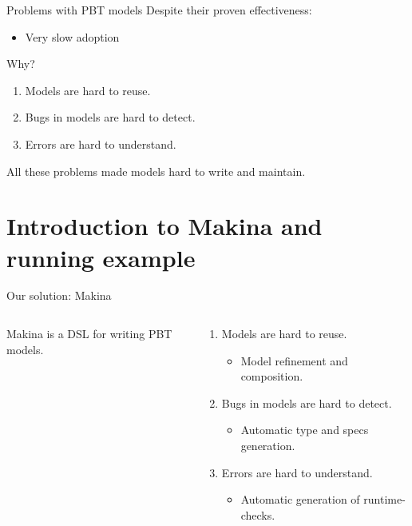 \documentclass[aspectratio=169, 10pt, handout]{beamer}
\begin{document}
\begin{frame}[label={sec:org48f1cea}]{Problems with PBT models}
Despite their proven effectiveness:
\begin{itemize}
\item Very slow adoption
\end{itemize}

\vspace{10pt}

Why?

\vspace{10pt}

\begin{enumerate}
\item Models are hard to reuse.
\item Bugs in models are hard to detect.
\item Errors are hard to understand.
\end{enumerate}

\vspace{10pt}

All these problems made models hard to write and maintain.
\end{frame}

\section{Introduction to Makina and running example}
\label{sec:org5b65cdf}
\begin{frame}[label={sec:org69a2064}]{Our solution: Makina}
\begin{columns}
\begin{column}{0.48\columnwidth}
Makina is a DSL for writing PBT models.

\vspace{10pt}
\end{column}

\begin{column}{0.48\columnwidth}
\begin{enumerate}
\item Models are hard to reuse.
\begin{itemize}
\item Model refinement and composition. \vspace{10pt}
\end{itemize}
\item Bugs in models are hard to detect.
\begin{itemize}
\item Automatic type and specs generation. \vspace{10pt}
\end{itemize}
\item Errors are hard to understand.
\begin{itemize}
\item Automatic generation of runtime-checks. \vspace{10pt}
\end{itemize}
\end{enumerate}
\end{column}
\end{columns}
\end{frame}
\end{document}

